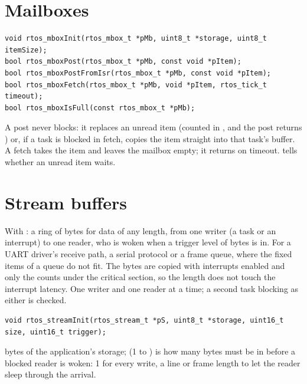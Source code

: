 \section{Mailboxes}

\begin{lstlisting}
void rtos_mboxInit(rtos_mbox_t *pMb, uint8_t *storage, uint8_t itemSize);
bool rtos_mboxPost(rtos_mbox_t *pMb, const void *pItem);
bool rtos_mboxPostFromIsr(rtos_mbox_t *pMb, const void *pItem);
bool rtos_mboxFetch(rtos_mbox_t *pMb, void *pItem, rtos_tick_t timeout);
bool rtos_mboxIsFull(const rtos_mbox_t *pMb);
\end{lstlisting}
A post never blocks: it replaces an unread item (counted in , and the
post returns ) or, if a task is blocked in fetch, copies the item straight
into that task's buffer. A fetch takes the item and leaves the mailbox empty; it returns
 on timeout.  tells whether an unread item waits.

\section{Stream buffers}
\label{sec:streams}

With : a ring of bytes for data of any length, from one writer
(a task or an interrupt) to one reader, who is woken when a trigger level of bytes is in.
For a UART driver's receive path, a serial protocol or a frame queue, where the fixed items
of a queue do not fit. The bytes are copied with interrupts enabled and only the counts
under the critical section, so the length does not touch the interrupt latency. One
writer and one reader at a time; a second task blocking as either is checked.

\begin{lstlisting}
void rtos_streamInit(rtos_stream_t *pS, uint8_t *storage, uint16_t size, uint16_t trigger);
\end{lstlisting}
 bytes of the application's storage;  (1 to ) is how
many bytes must be in before a blocked reader is woken: 1 for every write, a line or frame
length to let the reader sleep through the arrival.

